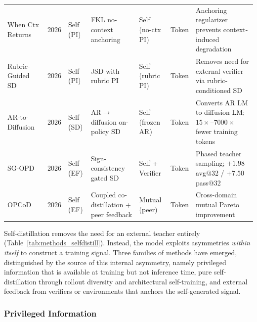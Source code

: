 \documentclass{article} %
\begin{document}
\begin{table}[t]
{\begin{tabular}{@{}lclllll@{}}
        When Ctx Returns~\citep{2606.11627} & 2026 & Self (PI) & FKL no-context anchoring & Self (no-ctx PI) & Token & Anchoring regularizer prevents context-induced degradation \\
        Rubric-Guided SD~\citep{2606.12507} & 2026 & Self (PI) & JSD with rubric PI & Self (rubric PI) & Token & Removes need for external verifier via rubric-conditioned SD \\
        AR-to-Diffusion~\citep{2606.06712} & 2026 & Self (SD) & AR$\to$diffusion on-policy SD & Self (frozen AR) & Token & Converts AR LM to diffusion LM; $15\times$--$7000\times$ fewer training tokens \\
        SG-OPD~\citep{2606.09304} & 2026 & Self (EF) & Sign-consistency gated SD & Self + Verifier & Token & Phased teacher sampling; $+1.98$ avg@32 / $+7.50$ pass@32 \\
        OPCoD~\citep{2606.14368} & 2026 & Self (EF) & Coupled co-distillation + peer feedback & Mutual (peer) & Token & Cross-domain mutual Pareto improvement \\
        \bottomrule
    \end{tabular}
    }
\end{table}

Self-distillation removes the need for an external teacher entirely (Table~\ref{tab:methods_selfdistill}). Instead, the model exploits asymmetries \emph{within itself} to construct a training signal. Three families of methods have emerged, distinguished by the source of this internal asymmetry, namely privileged information that is available at training but not inference time, pure self-distillation through rollout diversity and architectural self-training, and external feedback from verifiers or environments that anchors the self-generated signal.

\subsubsection{Privileged Information}
\label{subsec:self_pi}
\end{document}
